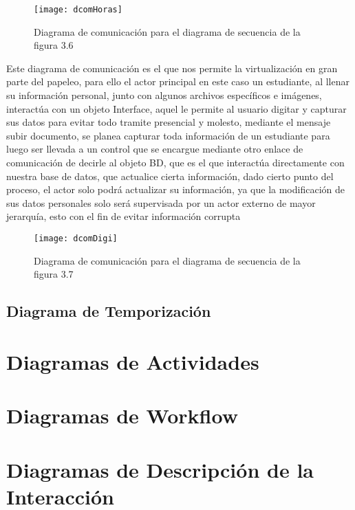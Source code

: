 \begin{figure}[H]
	\centering
	\texttt{[image: dcomHoras]}
    \centering
    \caption{Diagrama de comunicación para el diagrama de secuencia de la figura 3.6}
	\label{fig:dcomHoras}
\end{figure}
\clearpage
Este diagrama de comunicación es el que nos permite la virtualización en gran parte del papeleo, para ello el actor principal en este caso un estudiante, al llenar su información personal, junto con algunos archivos específicos e imágenes, interactúa con un objeto Interface, aquel le permite al usuario digitar y capturar sus datos para evitar todo tramite presencial y molesto, mediante el mensaje subir documento, se planea capturar toda información de un estudiante para luego ser llevada a un control que se encargue mediante otro enlace de comunicación de decirle al objeto BD, que es el que interactúa directamente con nuestra base de datos, que actualice cierta información, dado cierto punto del proceso, el actor solo podrá actualizar su información, ya que la modificación de sus datos personales solo será supervisada por un actor externo de mayor jerarquía, esto con el fin de evitar información corrupta
\begin{figure}[H]
	\centering
	\texttt{[image: dcomDigi]}
    \centering
    \caption{Diagrama de comunicación para el diagrama de secuencia de la figura 3.7}
	\label{fig:dcomDigi}
\end{figure}
\clearpage

\newpage

\subsection{Diagrama de Temporización}

\newpage

\section{Diagramas de Actividades}

\newpage

\section{Diagramas de Workflow}

\newpage

\section{Diagramas de Descripción de la Interacción}

\newpage